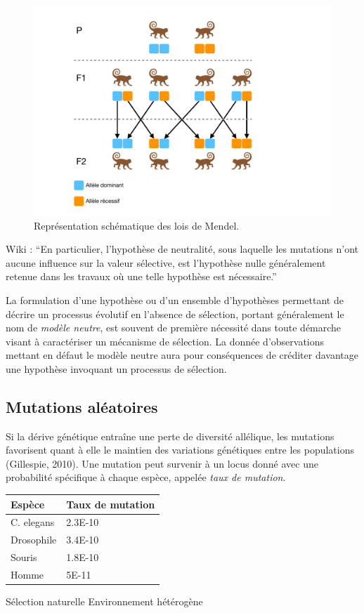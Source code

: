 \documentclass[12pt,twoside]{ugathesis}
\begin{document}
  \begin{figure}
  
  {\centering \includegraphics[width=500px]{figure/mendel} 
  
  }
  
  \caption{Représentation schématique des lois de Mendel.}\label{fig:mendel}
  \end{figure}
  Wiki : ``En particulier, l'hypothèse de neutralité, sous laquelle les
  mutations n'ont aucune influence sur la valeur sélective, est
  l'hypothèse nulle généralement retenue dans les travaux où une telle
  hypothèse est nécessaire.''
  
  La formulation d'une hypothèse ou d'un ensemble d'hypothèses permettant
  de décrire un processus évolutif en l'absence de sélection, portant
  généralement le nom de \textit{modèle neutre}, est souvent de première
  nécessité dans toute démarche visant à caractériser un mécanisme de
  sélection. La donnée d'observations mettant en défaut le modèle neutre
  aura pour conséquences de créditer davantage une hypothèse invoquant un
  processus de sélection.
  
  \subsection{Mutations aléatoires}\label{mutations-aleatoires}
  
  Si la dérive génétique entraîne une perte de diversité allélique, les
  mutations favorisent quant à elle le maintien des variations génétiques
  entre les populations (Gillespie, 2010). Une mutation peut survenir à un
  locus donné avec une probabilité spécifique à chaque espèce, appelée
  \textit{taux de mutation}.
  \begin{table}[!h]
  \centering
  \begin{tabular}{l|l}
  \hline
  Espèce & Taux de mutation\\
  \hline
  C. elegans & 2.3E-10\\
  \hline
  Drosophile & 3.4E-10\\
  \hline
  Souris & 1.8E-10\\
  \hline
  Homme & 5E-11\\
  \hline
  \end{tabular}
  \end{table}
  Sélection naturelle Environnement hétérogène
  
\end{document}
